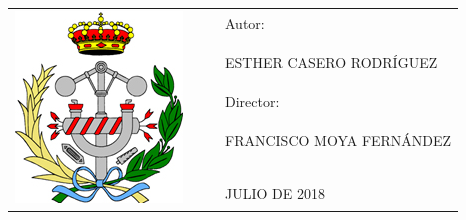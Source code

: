 \begin{tabular}{cccl}
 \multirow{11}{*}{\includegraphics[scale=0.75]{portada/toledo.jpg}}
 &  & & Autor:\\
 &  &  & \\
 &  &  & ESTHER CASERO RODRÍGUEZ \\
 &  &  & \\
 &  &  & Director: \\
 &  &  & \\
 &  &  & FRANCISCO MOYA FERNÁNDEZ \\
 &  &  & \\
 &  &  & \\
 &  &  & \\
 &  &  & JULIO DE 2018
\end{tabular}

\newpage
$\ $
\thispagestyle{empty}
